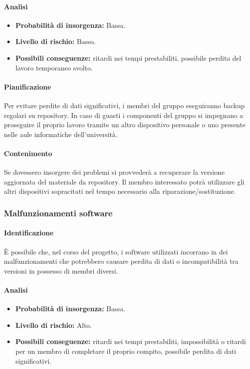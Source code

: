 \paragraph {Analisi}
\begin{itemize}
	\item \textbf{Probabilità di insorgenza:} Bassa.
	\item \textbf{Livello di rischio:} Basso.
	\item \textbf{Possibili conseguenze:} ritardi nei tempi prestabiliti, possibile perdita del lavoro temporaneo svolto.
\end{itemize}

\paragraph {Pianificazione}
Per evitare perdite di dati significativi, i membri del gruppo eseguiranno backup regolari su repository. In caso di guasti i componenti del gruppo si impegnano a proseguire il proprio lavoro tramite un altro dispositivo personale o uno presente nelle aule informatiche dell'università.

\paragraph {Contenimento}
Se dovessero insorgere dei problemi si provvederà a recuperare la versione aggiornata del materiale da repository.	Il membro interessato potrà utilizzare gli altri dispositivi sopracitati nel tempo necessario alla riparazione/sostituzione.

\subsubsection{Malfunzionamenti software}
\paragraph {Identificazione}
È possibile che, nel corso del progetto, i software utilizzati incorrano in dei malfunzionamenti che potrebbero causare perdita di dati o incompatibilità tra versioni in possesso di membri diversi.

\paragraph {Analisi}
\begin{itemize}
	\item \textbf{Probabilità di insorgenza:} Bassa.
	\item \textbf{Livello di rischio:} Alto.
	\item \textbf{Possibili conseguenze:} ritardi nei tempi prestabiliti, impossibilità o ritardi per un membro di completare il proprio compito, possibile perdita di dati significativi.
\end{itemize}

